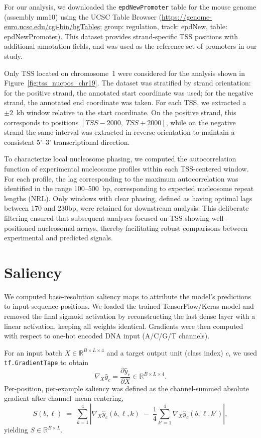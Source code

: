 \documentclass[11pt]{book}
\begin{document}
For our analysis, we downloaded the \texttt{epdNewPromoter} table for the mouse genome (assembly mm10) using the UCSC Table Browser (\url{https://genome-euro.ucsc.edu/cgi-bin/hgTables}; group: regulation, track: epdNew, table: epdNewPromoter). This dataset provides strand-specific TSS positions with additional annotation fields, and was used as the reference set of promoters in our study.

 Only TSS located on chromosome~1 were considered for the analysis shown in Figure~\ref{fig:tss_nucpos_chr19}. The dataset was stratified by strand orientation: for the positive strand, the annotated start coordinate was used; for the negative strand, the annotated end coordinate was taken. For each TSS, we extracted a $\pm 2$~kb window relative to the start coordinate. On the positive strand, this corresponds to positions $[TSS - 2000, \; TSS + 2000]$, while on the negative strand the same interval was extracted in reverse orientation to maintain a consistent 5'–3' transcriptional direction. 

To characterize local nucleosome phasing, we computed the autocorrelation function of experimental nucleosome profiles within each TSS-centered window. For each profile, the lag corresponding to the maximum autocorrelation was identified in the range 100–500~bp, corresponding to expected nucleosome repeat lengths (NRL). Only windows with clear phasing, defined as having optimal lags between 170 and 230bp, were retained for downstream analysis. This deliberate filtering ensured that subsequent analyses focused on TSS showing well-positioned nucleosomal arrays, thereby facilitating robust comparisons between experimental and predicted signals.

\section{Saliency}
We computed base-resolution saliency maps to attribute the model’s predictions to input sequence positions. We loaded the trained TensorFlow/Keras model and removed the final sigmoid activation by reconstructing the last dense layer with a linear activation, keeping all weights identical. Gradients were then computed with respect to one-hot encoded DNA input (A/C/G/T channels).

For an input batch $X \in \mathbb{R}^{B \times L \times 4}$ and a target output unit (class index) $c$, we used 
\texttt{tf.GradientTape} to obtain
\[
\nabla_X \hat{y}_c = \frac{\partial \hat{y}_c}{\partial X} \in \mathbb{R}^{B \times L \times 4}.
\]
Per-position, per-example saliency was defined as the channel-summed absolute gradient after channel–mean centering,
\[
S(b,\ell) \;=\; \sum_{k=1}^{4} \left| \nabla_X \hat{y}_c(b,\ell,k) \;-\; \frac{1}{4}\sum_{k'=1}^{4}\nabla_X \hat{y}_c(b,\ell,k') \right|,
\]
yielding \(S \in \mathbb{R}^{B \times L}\).
\end{document}
